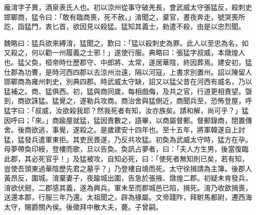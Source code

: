 
\begin{pinyinscope}
龐淯字子異，酒泉表氏人也。初以涼州從事守破羌長，會武威太守張猛反，殺刺史邯鄲商，猛令曰：「敢有臨商喪，死不赦。」淯聞之，棄官，晝夜奔走，號哭喪所訖，詣猛門，衷匕首，欲因見以殺猛。猛知其義士，勑遣不殺，由是以忠烈聞。

魏略曰：猛兵欲來縛淯，猛聞之，歎曰：「猛以殺刺史為罪。此人以至忠為名，如又殺之，何以勸一州履義之士邪！」遂使行服。典略曰：張猛字叔威，本燉煌人也。猛父奐，桓帝時仕歷郡守、中郎將、太常，遂居華陰，終因葬焉。建安初，猛仕郡為功曹，是時河西四郡以去涼州治遠，隔以河寇，上書求別置州。詔以陳留人邯鄲商為雍州刺史，別典四郡。時武威太守缺，詔又以猛父昔在河西有威名，乃以猛補之。商、猛俱西。初，猛與商同歲，每相戲侮，及共之官，行道更相責望。曁到，商欲誅猛。猛覺之，遂勒兵攻商。商治舍與猛側近，商聞兵至，恐怖登屋，呼猛字曰：「叔威，汝欲殺我耶？然我死者有知，汝亦族矣。請和解，尚可乎？」猛因呼曰；「來。」商踰屋就猛，猛因責數之，語畢，以商屬督郵。督郵錄商，閉置傳舍。後商欲逃，事覺，遂殺之。是歲建安十四年也。至十五年，將軍韓遂自上討猛，猛發兵遣軍東拒。其吏民畏遂，乃反共攻猛。初奐為武威太守時，猛方在孕。母夢帶奐印綬，登樓而歌，旦以告奐。奐訊占夢者，曰：「夫人方生男，後當復臨此郡，其必死官乎！」及猛被攻，自知必死，曰：「使死者無知則已矣，若有知，豈使吾頭東過華陰歷先君之墓乎？」乃登樓自燒而死。太守徐揖請為主簿。後郡人黃昂反，圍城。淯棄妻子，夜踰城出圍，告急於張掖、燉煌二郡。初疑未肯發兵，淯欲伏劒，二郡感其義，遂為興兵。軍未至而郡城邑已陷，揖死。淯乃收歛揖喪，送還本郡，行服三年乃還。太祖聞之，辟為掾屬。文帝踐阼，拜駙馬都尉，遷西海太守，賜爵關內侯。後徵拜中散大夫，薨。子曾嗣。


\end{pinyinscope}
